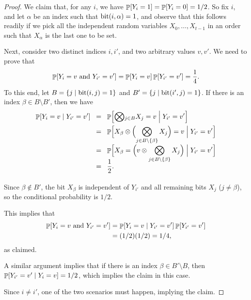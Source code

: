 \begin{proof}
    We claim that, for any $i$, we have
    $\Prob{Y_i=1} = \Prob{Y_i=0} =1/2$.  So fix $i$, and let $\alpha$ be an
    index such that $\bitY{i}{\alpha} =1$, and observe that this follows
    readily if we pick all the independent random variables
    $X_0, \ldots, X_{t-1}$ in an order such that $X_\alpha$ is the last
    one to be set.
    
    Next, consider two distinct indices $i,i'$, and two arbitrary
    values $v, v'$. We need to prove that
    \begin{equation*}
        \Prob{Y_{i} = v \text{ and } Y_{i'} = v'}%
        =%
        \Prob{Y_{i} = v} \Prob{ Y_{i'} = v'}%
        =%
        \frac{1}{4}.
    \end{equation*}
    To this end, let $B = \Set{j}{ \bitY{i}{j}=1}$ and
    $B' = \Set{j}{ \bitY{i'}{j}=1}$. If there is an index
    $\beta \in B \setminus B'$, then we have
    \begin{align*}
      \ProbCond{Y_{i} = v}{ Y_{i'} = v' }%
      &\EQ%
        \ProbCond{\Bigl.\smash \bigotimes_{j \in B} X_j= v}{ Y_{i'} = v' }%
        \\&
        \EQ%
        \ProbCond{\Bigl. X_\beta \otimes
        \Bigl(\smash{\bigotimes_{j \in B \setminus \brc{\beta}} X_j}\Bigr)=
        v}{ Y_{i'} = v' }%
      \\[0.2cm]
      &%
        \EQ%
        \ProbCond{\Bigl. X_\beta =
        \Bigl(v \otimes
        \smash{\bigotimes_{j \in B \setminus \brc{\beta}} X_j}\Bigr)}{ Y_{i'} = v' }%
     \\&%
     \EQ%
        \frac{1}{2}.
        \phantom{\bigotimes_{j}}%
    \end{align*}
    Since $\beta \notin B'$, the bit $X_\beta$ is independent of $Y_{i'}$
    and all remaining bits $X_j$ ($j \neq \beta$), so the conditional
    probability is $1/2$.

    This implies that
    \begin{align*}
        \Prob{Y_{i} = v \text{ and } Y_{i'} = v'}%
        &=%
        \ProbCond{Y_{i} = v}{ Y_{i'} = v' } \Prob{Y_{i'} = v'} \\
        &=(1/2)(1/2) = 1/4,
    \end{align*}
    as claimed.

            
    A similar argument implies that if there is an index
    $\beta \in B' \setminus B$, then
    $\mathop{\mathbb{P}}\!\left[ Y_{i'} = v' \;\middle\vert\;  Y_{i} = v  \right] = 1/2$, which implies the
    claim in this case.

    Since $i \neq i'$, one of the two scenarios must happen, implying
    the claim.
\end{proof}        


